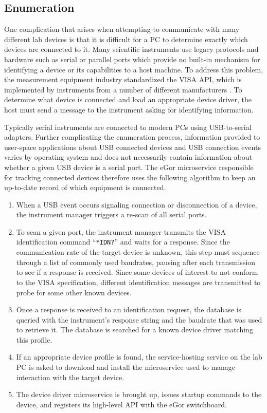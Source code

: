 \documentclass[../thesis]{subfiles}
\begin{document}
\subsection{Enumeration}
One complication that arises when attempting to communicate with many
different lab devices is that it is difficult for a PC to determine
exactly which devices are connected to it. Many scientific instruments
use legacy protocols and hardware such as serial or parallel ports
which provide no built-in mechanism for identifying a device or its
capabilities to a host machine. To address this problem, the
measurement equipment industry standardized the \gls{VISA} \gls{API},
which is implemented by instruments from a number of different
manufacturers \cite{VISA}. To determine what device is connected and
load an appropriate device driver, the host must send a message to the
instrument asking for identifying information.

Typically serial instruments are connected to modern PCs using
USB-to-serial adapters. Further complicating the enumeration process,
information provided to user-space applications about USB connected
devices and USB connection events varies by operating system and does
not necessarily contain information about whether a given USB device
is a serial port. The eGor microservice responsible for tracking
connected devices therefore uses the following algorithm to keep an
up-to-date record of which equipment is connected.

\begin{enumerate}
  \item{
      When a USB event occurs signaling connection or disconnection of
      a device, the instrument manager triggers a re-scan of all
      serial ports.
  }
  \item{
      To scan a given port, the instrument manager transmits the
      \gls{VISA} identification command ``\texttt{*IDN?}'' and waits
      for a response. Since the communication rate of the target
      device is unknown, this step must sequence through a list of
      commonly used baudrates, pausing after each transmission to see
      if a response is received. Since some devices of interest to not
      conform to the \gls{VISA} specification, different
      identification messages are transmitted to probe for some
      other known devices.
  }
  \item{
      Once a response is received to an identification request, the
      database is queried with the instrument's response string and
      the baudrate that was used to retrieve it. The database is
      searched for a known device driver matching this profile.
  }
  \item{
      If an appropriate device profile is found, the service-hosting service
      on the lab PC is asked to download and install the microservice
      used to manage interaction with the target device.
  }
  \item{
      The device driver microservice is brought up, issues startup
      commands to the device, and registers its high-level \gls{API}
      with the eGor switchboard.
  }
\end{enumerate}
\end{document}
